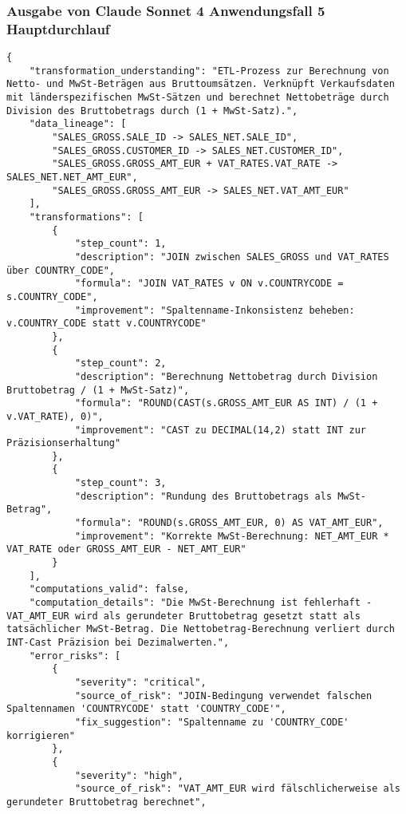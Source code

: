 \subsubsection{Ausgabe von Claude Sonnet 4 Anwendungsfall 5 Hauptdurchlauf}\label{anhang:subsubsec:claude_case5_prompt1}
\begin{lstlisting}[caption={Ausgabe: Claude Sonnet 4 Anwendungsfall 5 Hauptdurchlauf},label={claude_case5_prompt1}]
{
    "transformation_understanding": "ETL-Prozess zur Berechnung von Netto- und MwSt-Beträgen aus Bruttoumsätzen. Verknüpft Verkaufsdaten mit länderspezifischen MwSt-Sätzen und berechnet Nettobeträge durch Division des Bruttobetrags durch (1 + MwSt-Satz).",
    "data_lineage": [
        "SALES_GROSS.SALE_ID -> SALES_NET.SALE_ID",
        "SALES_GROSS.CUSTOMER_ID -> SALES_NET.CUSTOMER_ID",
        "SALES_GROSS.GROSS_AMT_EUR + VAT_RATES.VAT_RATE -> SALES_NET.NET_AMT_EUR",
        "SALES_GROSS.GROSS_AMT_EUR -> SALES_NET.VAT_AMT_EUR"
    ],
    "transformations": [
        {
            "step_count": 1,
            "description": "JOIN zwischen SALES_GROSS und VAT_RATES über COUNTRY_CODE",
            "formula": "JOIN VAT_RATES v ON v.COUNTRYCODE = s.COUNTRY_CODE",
            "improvement": "Spaltenname-Inkonsistenz beheben: v.COUNTRY_CODE statt v.COUNTRYCODE"
        },
        {
            "step_count": 2,
            "description": "Berechnung Nettobetrag durch Division Bruttobetrag / (1 + MwSt-Satz)",
            "formula": "ROUND(CAST(s.GROSS_AMT_EUR AS INT) / (1 + v.VAT_RATE), 0)",
            "improvement": "CAST zu DECIMAL(14,2) statt INT zur Präzisionserhaltung"
        },
        {
            "step_count": 3,
            "description": "Rundung des Bruttobetrags als MwSt-Betrag",
            "formula": "ROUND(s.GROSS_AMT_EUR, 0) AS VAT_AMT_EUR",
            "improvement": "Korrekte MwSt-Berechnung: NET_AMT_EUR * VAT_RATE oder GROSS_AMT_EUR - NET_AMT_EUR"
        }
    ],
    "computations_valid": false,
    "computation_details": "Die MwSt-Berechnung ist fehlerhaft - VAT_AMT_EUR wird als gerundeter Bruttobetrag gesetzt statt als tatsächlicher MwSt-Betrag. Die Nettobetrag-Berechnung verliert durch INT-Cast Präzision bei Dezimalwerten.",
    "error_risks": [
        {
            "severity": "critical",
            "source_of_risk": "JOIN-Bedingung verwendet falschen Spaltennamen 'COUNTRYCODE' statt 'COUNTRY_CODE'",
            "fix_suggestion": "Spaltenname zu 'COUNTRY_CODE' korrigieren"
        },
        {
            "severity": "high",
            "source_of_risk": "VAT_AMT_EUR wird fälschlicherweise als gerundeter Bruttobetrag berechnet",

\end{lstlisting}
